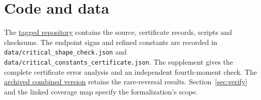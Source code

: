 \documentclass[EJP,preprint]{ejpecp}
\begin{document}
\section*{Code and data}
The \href{https://github.com/apemm/Kagey-Problems/tree/paperD-ejp-v9/kagey-problems/problem131/paperD}{tagged repository}
contains the source, certificate records, scripts and checksums.
The endpoint signs and refined constants are recorded in
\nolinkurl{data/critical_shape_check.json} and
\nolinkurl{data/critical_constants_certificate.json}.
The supplement gives the complete certificate error analysis and
an independent fourth-moment check. The
\href{https://github.com/apemm/Kagey-Problems/blob/paperD-ejp-v9/kagey-problems/problem131/paperD/archive/combined-2026-11-06/problem131_memory.pdf}{archived combined version}
retains the rare-reversal results. Section~\ref{sec:verify} and the
linked coverage map specify the formalization's scope.

\appendix






\end{document}
